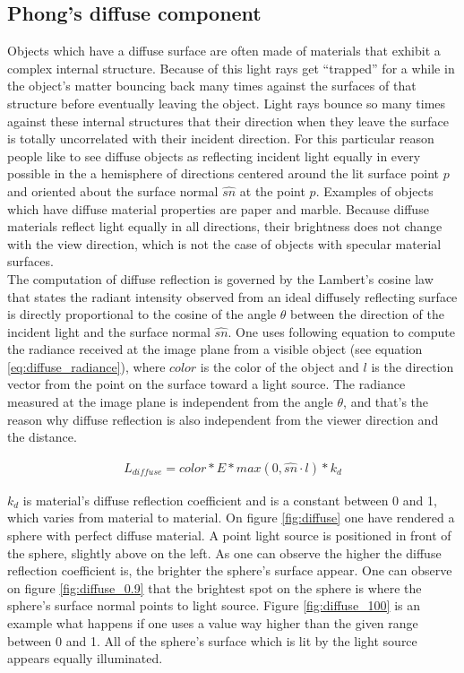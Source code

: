 \documentclass{article}
\begin{document}
\subsection*{Phong's diffuse component}
Objects which have a diffuse surface are often made of materials that exhibit a complex internal structure. Because of this light rays get ``trapped'' for a while in the object's matter bouncing back many times against the surfaces of that structure before eventually leaving the object. Light rays bounce so many times against these internal structures that their direction when they leave the surface is totally uncorrelated with their incident direction. For this particular reason people like to see diffuse objects as reflecting incident light equally in every possible in the a hemisphere of directions centered around the lit surface point $p$ and oriented about the surface normal $\hat{sn}$ at the point $p$. Examples of objects which have diffuse material properties are paper and marble. Because diffuse materials reflect light equally in all directions, their brightness does not change with the view direction, which is not the case of objects with specular material surfaces. \\
The computation of diffuse reflection is governed by the Lambert's cosine law that states the radiant intensity observed from an ideal diffusely reflecting surface is directly proportional to the cosine of the angle $\theta$ between the direction of the incident light and the surface normal $\hat{sn}$. One uses following equation to compute the radiance received at the image plane from a visible object (see equation \ref{eq:diffuse_radiance}), where $color$ is the color of the object and $l$ is the direction vector from the point on the surface toward a light source. The radiance measured at the image plane is independent from the angle $\theta$, and that's the reason why diffuse reflection is also independent from the viewer direction and the distance.

\begin{align}
L_{diffuse} = color * E * max(0, \hat{sn} \cdot l) * k_{d}
\label{eq:diffuse_radiance}
\end{align}

$k_{d}$ is material's diffuse reflection coefficient and is a constant between 0 and 1, which varies from material to material. On figure \ref{fig:diffuse} one have rendered a sphere with perfect diffuse material. A point light source is positioned in front of the sphere, slightly above on the left. As one can observe the higher the diffuse reflection coefficient is, the brighter the sphere's surface appear. One can observe on figure \ref{fig:diffuse_0.9} that the brightest spot on the sphere is where the sphere's surface normal points to light source. Figure \ref{fig:diffuse_100} is an example what happens if one uses a value way higher than the given range between 0 and 1. All of the sphere's surface which is lit by the light source appears equally illuminated. 
\end{document}
